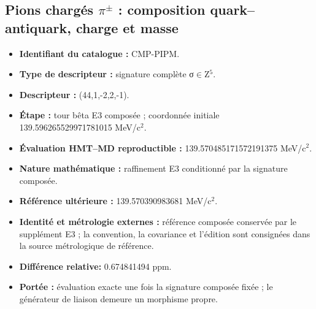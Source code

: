\subsection{Pions chargés \(\pi^\pm\) : composition quark–antiquark, charge et masse}
\begin{itemize}
\item \textbf{Identifiant du catalogue :} CMP-PIPM.
\item \textbf{Type de descripteur :} signature complète σ\(\in\)Z\({}^{5}\).
\item \textbf{Descripteur :} (44,1,-2,2,-1).
\item \textbf{Étape :} tour bêta E3 composée ; coordonnée initiale 139.596265\allowbreak{}529971\allowbreak{}781015 MeV/c\({}^{2}\).
\item \textbf{Évaluation HMT--MD reproductible :} 139.570485\allowbreak{}171572\allowbreak{}191375 MeV/c\({}^{2}\).
\item \textbf{Nature mathématique :} raffinement E3 conditionné par la signature composée.
\item \textbf{Référence ultérieure :} 139.570390\allowbreak{}983681 MeV/c\({}^{2}\).
\item \textbf{Identité et métrologie externes :} référence composée conservée par le supplément E3 ; la convention, la covariance et l’édition sont consignées dans la source métrologique de référence.
\item \textbf{Différence relative:} 0.674841\allowbreak{}494 ppm.
\item \textbf{Portée :} évaluation exacte une fois la signature composée fixée ; le générateur de liaison demeure un morphisme propre.
\end{itemize}

